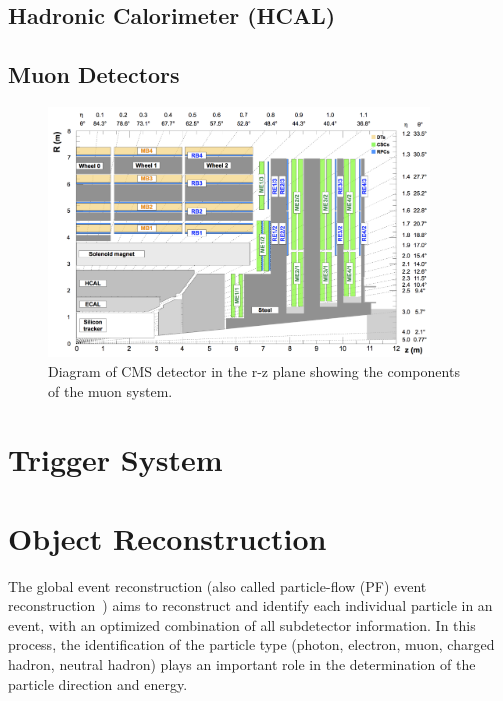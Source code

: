 \subsection{Hadronic Calorimeter (HCAL)}

\subsection{Muon Detectors}

\begin{figure}
  \centering
   \includegraphics[width=0.9\textwidth]{fig/experiment/detector/muon_sys_r-z.png}
	\caption{Diagram of CMS detector in the r-z plane showing the components of the muon system.}
\end{figure}

\section{Trigger System}

\section{Object Reconstruction}
The global event reconstruction (also called particle-flow (PF) event reconstruction~\cite{CMS:2017yfk}) aims to reconstruct and identify each individual particle in an event, with an optimized combination of all subdetector information. In this process, the identification of the particle type (photon, electron, muon, charged hadron, neutral hadron) plays an important role in the determination of the particle direction and energy.

